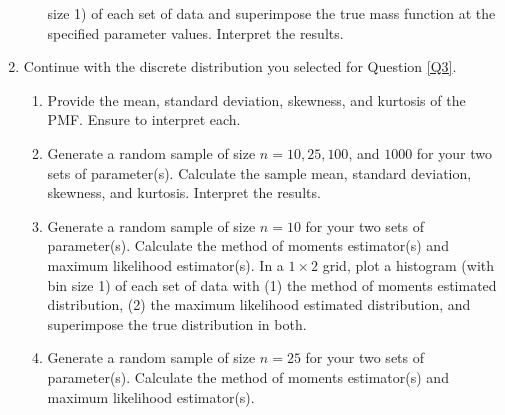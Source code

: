 \documentclass{article}\usepackage[]{graphicx}\usepackage[]{color}
\begin{document}
\begin{enumerate}
\begin{enumerate}
  size 1) of each set of data and superimpose the true mass function at the 
  specified parameter values. Interpret the results.
	\end{enumerate}
\item Continue with the discrete distribution you selected for Question \ref{Q3}.
\begin{enumerate}
  \item Provide the mean, standard deviation, skewness, and kurtosis of the PMF. 
  Ensure to interpret each.
  \item Generate a random sample of size $n=10, 25, 100$, and $1000$ for your 
  two sets of parameter(s). Calculate the sample mean, standard deviation, 
  skewness, and kurtosis. Interpret the results.
  \item Generate a random sample of size $n=10$ for your two sets of parameter(s).
  Calculate the method of moments estimator(s) and maximum likelihood estimator(s).
  In a $1 \times 2$ grid, plot a histogram (with bin size 1) of each set of data 
  with (1) the method of moments estimated distribution, (2) the maximum likelihood 
  estimated distribution, and superimpose the true distribution in both.
  \item Generate a random sample of size $n=25$ for your two sets of parameter(s). 
  Calculate the method of moments estimator(s) and maximum likelihood estimator(s).

\end{enumerate}
\end{enumerate}
\end{document}
